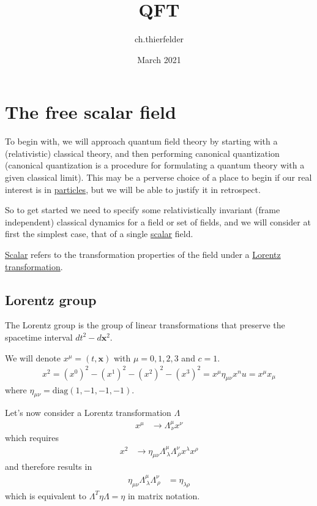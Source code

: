 \documentclass{article}
\title{QFT}
\author{ch.thierfelder }
\date{March 2021}
\begin{document}
\maketitle
\tableofcontents

\section{The free scalar field}

To begin with, we will approach quantum field theory by starting with a (relativistic) classical theory, and then performing canonical quantization (canonical quantization is a procedure for formulating a quantum theory with a given classical limit). This may be a perverse choice of a place to begin if our real interest is in \underline{particles}, but we will be able to justify it in retrospect.

So to get started we need to specify some relativistically invariant (frame independent) classical dynamics for a field or set of fields, and we will consider at first the simplest case, that of a single \underline{scalar} field.

\underline{Scalar} refers to the transformation properties of the field under a \underline{Lorentz transformation}.

\subsection{Lorentz group}
The Lorentz group is the group of linear transformations that preserve the spacetime interval $dt^2-d\mathbf{x}^2$.

We will denote $x^\mu=(t,\mathbf{x})$ with $\mu=0, 1, 2, 3$ and $c=1$.
\begin{align}
x^2
=(x^0)^2-(x^1)^2-(x^2)^2-(x^3)^2
=x^\mu\eta_{\mu\nu}x^nu=x^\mu x_\mu
\end{align}
where $\eta_{\mu\nu}=\text{diag}(1,-1,-1,-1)$. 

Let's now consider a Lorentz transformation $\Lambda$
\begin{align}
x^\mu&\rightarrow\Lambda^\mu_{\,\nu}x^\nu
\end{align}
which requires
\begin{align}
x^2&\rightarrow\eta_{\mu\nu}\Lambda^\mu_{\,\lambda}\Lambda^\nu_{\,\rho}x^\lambda x^\rho
\end{align}
and therefore results in
\begin{align}
\eta_{\mu\nu}\Lambda^\mu_{\,\lambda}\Lambda^\nu_{\,\rho}&=\eta_{\lambda\rho}
\end{align}
which is equivalent to $\Lambda^T\eta\Lambda=\eta$ in matrix notation.
\end{document}
